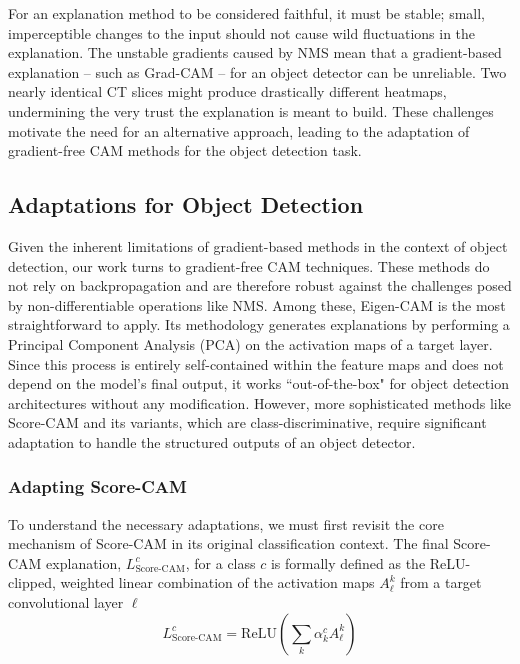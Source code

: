 For an explanation method to be considered faithful, it must be stable; small, imperceptible changes to the input should not cause wild fluctuations in the explanation. The unstable gradients caused by NMS mean that a gradient-based explanation -- such as Grad-CAM -- for an object detector can be unreliable. Two nearly identical CT slices might produce drastically different heatmaps, undermining the very trust the explanation is meant to build. These challenges motivate the need for an alternative approach, leading to the adaptation of gradient-free CAM methods for the object detection task.

\subsection{Adaptations for Object Detection}
Given the inherent limitations of gradient-based methods in the context of object detection, our work turns to gradient-free CAM techniques. These methods do not rely on backpropagation and are therefore robust against the challenges posed by non-differentiable operations like NMS.
Among these, Eigen-CAM is the most straightforward to apply. Its methodology generates explanations by performing a Principal Component Analysis (PCA) on the activation maps of a target layer. Since this process is entirely self-contained within the feature maps and does not depend on the model's final output, it works ``out-of-the-box" for object detection architectures without any modification.
However, more sophisticated methods like Score-CAM and its variants, which are class-discriminative, require significant adaptation to handle the structured outputs of an object detector.

\subsubsection{Adapting Score-CAM}

To understand the necessary adaptations, we must first revisit the core mechanism of Score-CAM in its original classification context. The final Score-CAM explanation, $L^{c}_{\text{Score-CAM}}$, for a class $c$ is formally defined as the ReLU-clipped, weighted linear combination of the activation maps $A^{k}_{\ell}$ from a target convolutional layer $\ell$
\begin{equation}
    L^{c}_{\text{Score-CAM}} = \mathrm{ReLU}\left( \sum_{k} \alpha^{c}_{k} A^{k}_{\ell} \right)
    \label{eq:scorecam}
\end{equation}

